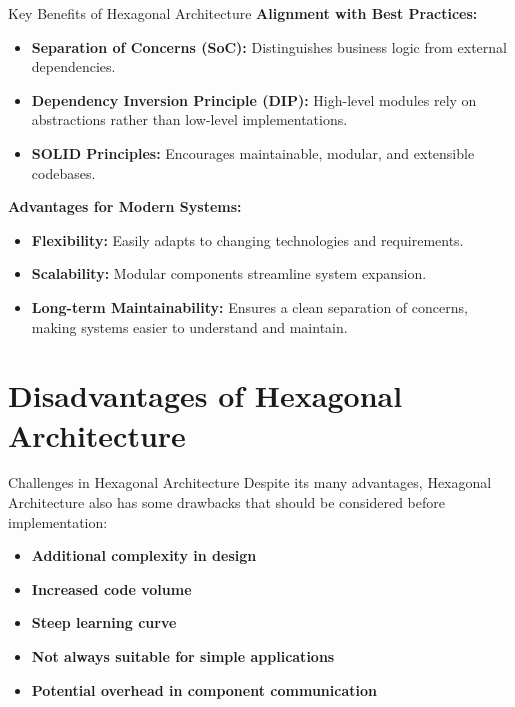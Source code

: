 \documentclass[aspectratio=169, table]{beamer}
\begin{document}
\begin{frame}[fragile]{Key Benefits of Hexagonal Architecture}
	\vspace{20pt}
	\textbf{Alignment with Best Practices:}
	\begin{itemize}
		\item \textbf{Separation of Concerns (SoC):} Distinguishes business logic from external dependencies.
		\item \textbf{Dependency Inversion Principle (DIP):} High-level modules rely on abstractions rather than low-level implementations.
		\item \textbf{SOLID Principles:} Encourages maintainable, modular, and extensible codebases.
	\end{itemize}
	
	\textbf{Advantages for Modern Systems:}
	\begin{itemize}
		\item \textbf{Flexibility:} Easily adapts to changing technologies and requirements.
		\item \textbf{Scalability:} Modular components streamline system expansion.
		\item \textbf{Long-term Maintainability:} Ensures a clean separation of concerns, making systems easier to understand and maintain.
	\end{itemize}
\end{frame}


\section{Disadvantages of Hexagonal Architecture}

\begin{frame}[fragile]{Challenges in Hexagonal Architecture}
	\vspace{20pt}
	Despite its many advantages, Hexagonal Architecture also has some drawbacks that should be considered before implementation:
	\begin{itemize}
		\item \textbf{Additional complexity in design}
		\item \textbf{Increased code volume}
		\item \textbf{Steep learning curve}
		\item \textbf{Not always suitable for simple applications}
		\item \textbf{Potential overhead in component communication}
	\end{itemize}
\end{frame}
\end{document}
